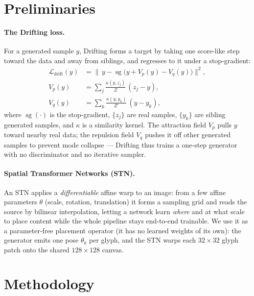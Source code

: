 \documentclass{article}
\newcommand{\sg}{\operatorname{sg}}
\begin{document}
\section{Preliminaries}
\label{sec:prelim}

\paragraph{The Drifting loss.}
For a generated sample $y$, Drifting \citep{lambert2026drifting} forms a target by taking one
score-like step toward the data and away from siblings, and regresses to it under a stop-gradient:
\begin{align}
\label{eq:drift}
   \mathcal{L}_{\mathrm{drift}}(y) &= \big\| \, y - \sg\!\big(y + V_p(y) - V_q(y)\big) \big\|^2,\\
   V_p(y) &= \sum_j \frac{\kappa(y,z_j)}{Z}\,(z_j - y),\\
   V_q(y) &= \sum_k \frac{\kappa(y,y_k)}{Z'}\,(y - y_k),
\end{align}
where $\sg(\cdot)$ is the stop-gradient, $\{z_j\}$ are real samples, $\{y_k\}$ are sibling generated
samples, and $\kappa$ is a similarity kernel. The attraction field $V_p$ pulls $y$ toward nearby real
data; the repulsion field $V_q$ pushes it off other generated samples to prevent mode collapse ---
Drifting thus trains a one-step generator with no discriminator and no iterative sampler.

\paragraph{Spatial Transformer Networks (STN).}
An STN \citep{jaderberg2015spatial} applies a \emph{differentiable} affine warp to an image: from a few
affine parameters $\theta$ (scale, rotation, translation) it forms a sampling grid and reads the source
by bilinear interpolation, letting a network learn \emph{where} and at what scale to place content while
the whole pipeline stays end-to-end trainable. We use it as a parameter-free placement operator (it has
no learned weights of its own): the generator emits one pose $\theta_k$ per glyph, and the STN warps
each $32{\times}32$ glyph patch onto the shared $128{\times}128$ canvas.

\section{Methodology}
\label{sec:overview}
\end{document}
